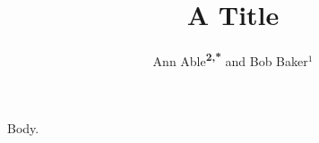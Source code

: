 \documentclass{revtex4-2}
\begin{document}
\title{A Title}
\author{Ann Able\textsuperscript{\textbf{2,*}} and Bob Baker$^{1}$}
\maketitle
Body.
\end{document}
